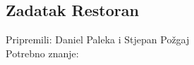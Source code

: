 \subsection*{Zadatak Restoran}
\textsf{Pripremili: Daniel Paleka i Stjepan Požgaj}\\
\textsf{Potrebno znanje: }

